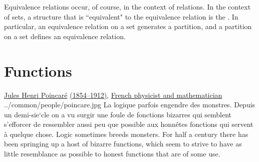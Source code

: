 \begin{definition}
\label{def:eqclass}
\end{definition}

Equivalence relations occur, of course, in the context of relations.
In the context of sets, a structure that is ``equivalent" to the equivalence relation
is the .
In particular, an equivalence relation on a set generates a partition,
and a partition on a set defines an equivalence relation.

\section{Functions}
\qboxnpqt
  { \href{http://www-history.mcs.st-andrews.ac.uk/Biographies/Poincare.html}{Jules Henri Poincar\'e} 
    \href{http://www-history.mcs.st-andrews.ac.uk/Timelines/TimelineF.html}{(1854--1912)}, 
    \href{http://www-history.mcs.st-andrews.ac.uk/BirthplaceMaps/Places/France.html}{French physicist and mathematician}
    \footnotemark
  }
  {../common/people/poincare.jpg}
  {La logique parfois engendre des monstres. 
   Depuis un demi-sie`cle on a vu surgir une foule de fonctions bizarres qui 
   semblent s'efforcer de ressembler aussi peu que possible aux honn\^etes 
   fonctions qui servent \`a quelque chose.}
  {Logic sometimes breeds monsters. 
   For half a century there has been springing up a host of bizarre functions, 
   which seem to strive to have as little resemblance as possible to honest functions
   that are of some use.}

